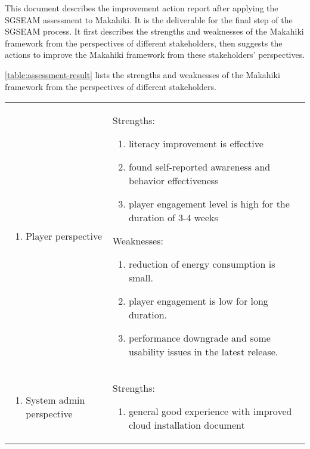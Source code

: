 
This document describes the improvement action report after applying the SGSEAM assessment to Makahiki. It is the deliverable for the final step of the SGSEAM process. It first describes the strengths and weaknesses of the Makahiki framework from the perspectives of different stakeholders, then suggests the actions to improve the Makahiki framework from these stakeholders' perspectives.

\autoref{table:assessment-result} lists the strengths and weaknesses of the Makahiki framework from the perspectives of  different stakeholders.

\begin{table}[ht!]
  \centering
  \begin{tabular}{|P{0.15\columnwidth}|P{0.78\columnwidth}|}
    \hline
     &
     \\
    \hline
    \begin{enumerate}[label={}, nosep, leftmargin=*]
    \item Player perspective 
    \end{enumerate}
    & 
    Strengths:
    \begin{enumerate}[nosep, leftmargin=*]
    \item literacy improvement is effective 
    \item found self-reported awareness and behavior effectiveness 
    \item player engagement level is high for the duration of 3-4 weeks
    \end{enumerate}               
     Weaknesses:
    \begin{enumerate}[nosep, leftmargin=*]
     \item reduction of energy consumption is small.
     \item player engagement is low for long duration.
     \item performance downgrade and some usability issues in the latest release.
     \end{enumerate}  \\
    \hline
    \begin{enumerate}[label={}, nosep, leftmargin=*]
    \item System admin perspective 
    \end{enumerate}
    & 
    Strengths:
    \begin{enumerate}[label={}, nosep, leftmargin=*]
    \item general good experience with improved cloud installation document 

\end{enumerate}
\end{tabular}
\end{table}
